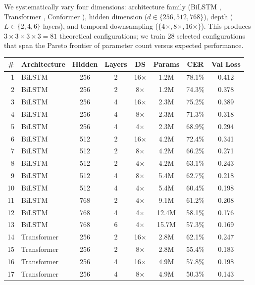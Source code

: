 \documentclass[11pt]{article}
\begin{document}
We systematically vary four dimensions: architecture family (BiLSTM \cite{hochreiter1997lstm}, Transformer \cite{vaswani2017attention}, Conformer \cite{gulati2020conformer}), hidden dimension ($d \in \{256, 512, 768\}$), depth ($L \in \{2, 4, 6\}$ layers), and temporal downsampling ($\{4\times, 8\times, 16\times\}$).
This produces $3 \times 3 \times 3 \times 3 = 81$ theoretical configurations; we train 28 selected configurations that span the Pareto frontier of parameter count versus expected performance.

\begin{table}[t]
\centering
\small
\begin{tabular}{rlcccccc}
\toprule
\textbf{\#} & \textbf{Architecture} & \textbf{Hidden} & \textbf{Layers} & \textbf{DS} & \textbf{Params} & \textbf{CER} & \textbf{Val Loss} \\
\midrule
1 & BiLSTM & 256 & 2 & 16$\times$ & 1.2M & 78.1\% & 0.412 \\
2 & BiLSTM & 256 & 2 & 8$\times$ & 1.2M & 74.3\% & 0.378 \\
3 & BiLSTM & 256 & 4 & 16$\times$ & 2.3M & 75.2\% & 0.389 \\
4 & BiLSTM & 256 & 4 & 8$\times$ & 2.3M & 71.3\% & 0.318 \\
5 & BiLSTM & 256 & 4 & 4$\times$ & 2.3M & 68.9\% & 0.294 \\
6 & BiLSTM & 512 & 2 & 16$\times$ & 4.2M & 72.4\% & 0.341 \\
7 & BiLSTM & 512 & 2 & 8$\times$ & 4.2M & 66.2\% & 0.271 \\
8 & BiLSTM & 512 & 2 & 4$\times$ & 4.2M & 63.1\% & 0.243 \\
9 & BiLSTM & 512 & 4 & 8$\times$ & 5.4M & 62.7\% & 0.218 \\
10 & BiLSTM & 512 & 4 & 4$\times$ & 5.4M & 60.4\% & 0.198 \\
11 & BiLSTM & 768 & 2 & 4$\times$ & 9.1M & 61.2\% & 0.208 \\
12 & BiLSTM & 768 & 4 & 4$\times$ & 12.4M & 58.1\% & 0.176 \\
13 & BiLSTM & 768 & 6 & 4$\times$ & 15.7M & 57.3\% & 0.169 \\
\midrule
14 & Transformer & 256 & 2 & 16$\times$ & 2.8M & 62.1\% & 0.247 \\
15 & Transformer & 256 & 2 & 8$\times$ & 2.8M & 55.4\% & 0.183 \\
16 & Transformer & 256 & 4 & 16$\times$ & 4.9M & 57.8\% & 0.198 \\
17 & Transformer & 256 & 4 & 8$\times$ & 4.9M & 50.3\% & 0.143 \\

\end{tabular}
\end{table}
\end{document}
